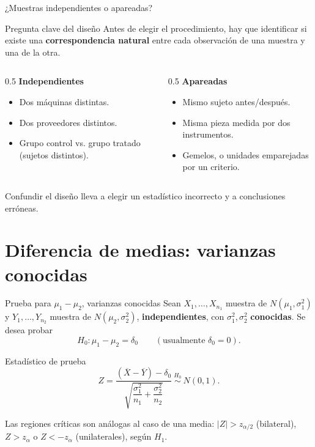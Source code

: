 \documentclass[aspectratio=169,11pt]{beamer}
\begin{document}
\begin{frame}{¿Muestras independientes o apareadas?}
\begin{alertblock}{Pregunta clave del diseño}
Antes de elegir el procedimiento, hay que identificar si existe una \textbf{correspondencia natural} entre cada observación de una muestra y una de la otra.
\end{alertblock}

\begin{columns}[t]
\begin{column}{0.5\textwidth}
\textbf{Independientes}
\begin{itemize}
\item Dos máquinas distintas.
\item Dos proveedores distintos.
\item Grupo control vs. grupo tratado (sujetos distintos).
\end{itemize}
\end{column}
\begin{column}{0.5\textwidth}
\textbf{Apareadas}
\begin{itemize}
\item Mismo sujeto antes/después.
\item Misma pieza medida por dos instrumentos.
\item Gemelos, o unidades emparejadas por un criterio.
\end{itemize}
\end{column}
\end{columns}
\vspace{0.3cm}
Confundir el diseño lleva a elegir un estadístico incorrecto y a conclusiones erróneas.
\end{frame}

\section{Diferencia de medias: varianzas conocidas}

\begin{frame}{Prueba para $\mu_1-\mu_2$, varianzas conocidas}
Sean $X_1,\dots,X_{n_1}$ muestra de $N(\mu_1,\sigma_1^2)$ y $Y_1,\dots,Y_{n_2}$ muestra de $N(\mu_2,\sigma_2^2)$, \textbf{independientes}, con $\sigma_1^2,\sigma_2^2$ \textbf{conocidas}. Se desea probar
\[
H_0:\mu_1-\mu_2=\delta_0 \qquad (\text{usualmente } \delta_0=0).
\]

\begin{block}{Estadístico de prueba}
\[
Z=\frac{(\overline{X}-\overline{Y})-\delta_0}{\sqrt{\dfrac{\sigma_1^2}{n_1}+\dfrac{\sigma_2^2}{n_2}}} \ \overset{H_0}{\sim}\ N(0,1).
\]
\end{block}

Las regiones críticas son análogas al caso de una media: $|Z|>z_{\alpha/2}$ (bilateral), $Z>z_\alpha$ o $Z<-z_\alpha$ (unilaterales), según $H_1$.
\end{frame}
\end{document}
